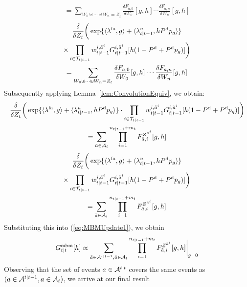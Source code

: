 \documentclass[journal,twoside]{IEEEtran}
\theoremstyle{plain}
\begin{document}
\begin{IEEEproof}
\begin{multline}
=
\sum_{W_0 \uplus \cdots \uplus W_n = Z_t}
\frac{\delta F_{\tilde{a},0}}{\delta W_0}[g,h] \cdots
\frac{\delta F_{\tilde{a},n}}{\delta W_n}[g,h]
\end{multline}
\else
\begin{multline}
\frac{\delta}{\delta Z_t}\bigg(\exp\{\langle\lambda^\mathrm{fa},g\rangle + \langle\lambda^u_{t|t-1},h P^{\mathrm{d}} p_g\rangle\}  \\
\times \prod_{i\in{\cal T}_{t|t-1}}w^{i,\tilde{a}^i}_{t|t-1}G^{i,\tilde{a}^i}_{t|t-1}[h(1-P^{\mathrm{d}} + P^{\mathrm{d}} p_g)]\bigg) \\
=
\sum_{W_0 \uplus \cdots \uplus W_n = Z_t}
\frac{\delta F_{\tilde{a},0}}{\delta W_0}[g,h] \cdots
\frac{\delta F_{\tilde{a},n}}{\delta W_n}[g,h]
\end{multline}
\fi
%
Subsequently applying Lemma~\ref{lem:ConvolutionEquiv}, we obtain:
%
\ifCLASSOPTIONdraftcls
\begin{multline}
\frac{\delta}{\delta Z_t}\bigg(\exp\{\langle\lambda^\mathrm{fa},g\rangle + \langle\lambda^u_{t|t-1},h P^{\mathrm{d}} p_g\rangle\} %
\cdot \prod_{i\in{\cal T}_{t|t-1}}w^{i,\tilde{a}^i}_{t|t-1}G^{i,\tilde{a}^i}_{t|t-1}[h(1-P^{\mathrm{d}} + P^{\mathrm{d}} p_g)]\bigg) \\
= \sum_{\bar{a}\in{\cal A}_t}\prod_{i=1}^{n_{t|t-1}+m_t} F_{\tilde{a},i}^{Z^{\bar{a}^i}}[g,h]
\end{multline}
\else
\begin{multline}
\frac{\delta}{\delta Z_t}\bigg(\exp\{\langle\lambda^\mathrm{fa},g\rangle + \langle\lambda^u_{t|t-1},h P^{\mathrm{d}} p_g\rangle\}  \\
\times \prod_{i\in{\cal T}_{t|t-1}}w^{i,\tilde{a}^i}_{t|t-1}G^{i,\tilde{a}^i}_{t|t-1}[h(1-P^{\mathrm{d}} + P^{\mathrm{d}} p_g)]\bigg) \\
= \sum_{\bar{a}\in{\cal A}_t}\prod_{i=1}^{n_{t|t-1}+m_t} F_{\tilde{a},i}^{Z^{\bar{a}^i}}[g,h]
\end{multline}
\fi
%
Substituting this into (\ref{eq:MBMUpdate1}), we obtain
%
\begin{equation}
G^\mathrm{mbm}_{t|t}[h] \propto \sum_{\tilde{a}\in{\cal A}^{t|t-1},\bar{a}\in{\cal A}_t}\prod_{i=1}^{n_{t|t-1}+m_t} F_{\tilde{a},i}^{Z^{\bar{a}^i}}[g,h]\bigg|_{g=0}
\end{equation}
%
Observing that the set of events $a\in{\cal A}^{t|t}$ covers the same events as $(\tilde{a}\in{\cal A}^{t|t-1},\bar{a}\in{\cal A}_t)$, we arrive at our final result
%
\begin{equation}

\end{equation}
\end{IEEEproof}
\end{document}
